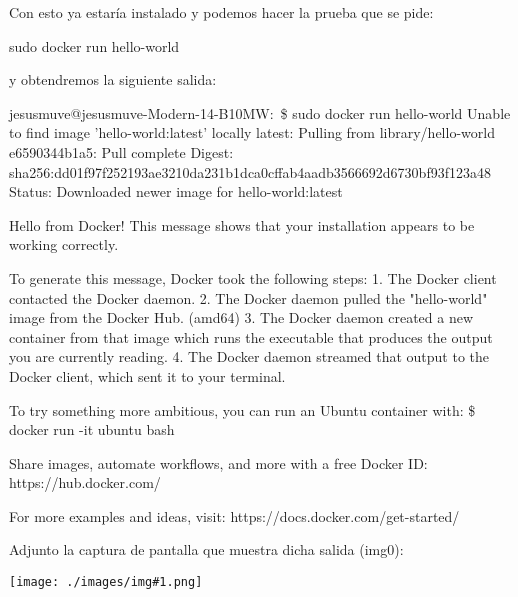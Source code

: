 \documentclass[12pt]{article}
\newcommand{\img}[1] {
    \begin{center}
        \texttt{[image: ./images/img\#1.png]}
    \end{center}
}
\begin{document}
Con esto ya estaría instalado y podemos hacer la prueba que se pide:
\begin{icodeblock}[bash]
sudo docker run hello-world
\end{icodeblock}
y obtendremos la siguiente salida:
\begin{icodeblock}[bash]
jesusmuve@jesusmuve-Modern-14-B10MW:~\$ sudo docker run hello-world
Unable to find image 'hello-world:latest' locally
latest: Pulling from library/hello-world
e6590344b1a5: Pull complete 
Digest: sha256:dd01f97f252193ae3210da231b1dca0cffab4aadb3566692d6730bf93f123a48
Status: Downloaded newer image for hello-world:latest

Hello from Docker!
This message shows that your installation appears to be working correctly.

To generate this message, Docker took the following steps:
 1. The Docker client contacted the Docker daemon.
 2. The Docker daemon pulled the "hello-world" image from the Docker Hub.
    (amd64)
 3. The Docker daemon created a new container from that image which runs the
    executable that produces the output you are currently reading.
 4. The Docker daemon streamed that output to the Docker client, which sent it
    to your terminal.

To try something more ambitious, you can run an Ubuntu container with:
 \$ docker run -it ubuntu bash

Share images, automate workflows, and more with a free Docker ID:
 https://hub.docker.com/

For more examples and ideas, visit:
 https://docs.docker.com/get-started/

\end{icodeblock}

Adjunto la captura de pantalla que muestra dicha salida (img0):

\img{0}
\end{document}
